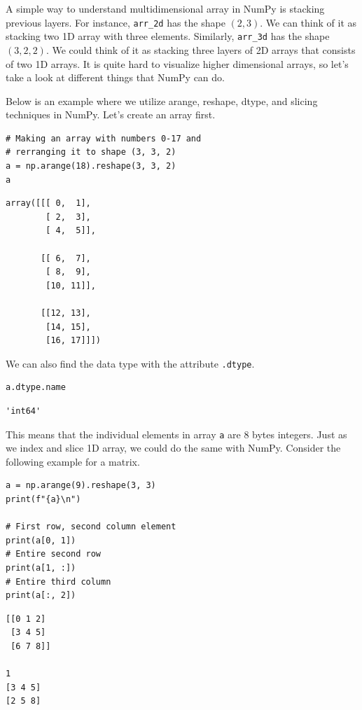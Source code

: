 \documentclass[../../../main.tex]{subfiles}
\begin{document}
A simple way to understand multidimensional array in NumPy is
stacking previous layers. For instance, \verb|arr_2d| has the
shape $(2, 3)$. We can think of it as stacking two 1D array
with three elements. Similarly, \verb|arr_3d| has the shape
$(3, 2, 2)$. We could think of it as stacking three layers of
2D arrays that consists of two 1D arrays. It is quite hard
to visualize higher dimensional arrays, so let's take a look
at different things that NumPy can do.

Below is an example where we utilize arange, reshape, dtype,
and slicing techniques in NumPy. Let's create an array first.

\begin{jupyter}
\begin{lstlisting}[style=jin]
# Making an array with numbers 0-17 and
# rerranging it to shape (3, 3, 2)
a = np.arange(18).reshape(3, 3, 2)
a
\end{lstlisting}

\begin{lstlisting}[style=jout]
array([[[ 0,  1],
        [ 2,  3],
        [ 4,  5]],

       [[ 6,  7],
        [ 8,  9],
        [10, 11]],

       [[12, 13],
        [14, 15],
        [16, 17]]])
\end{lstlisting}
\end{jupyter}

We can also find the data type with the attribute \verb|.dtype|.

\begin{jupyter}
\begin{lstlisting}[style=jin]
a.dtype.name
\end{lstlisting}

\begin{lstlisting}[style=jout]
'int64'
\end{lstlisting}
\end{jupyter}

This means that the individual elements in array \verb|a| are 8
bytes integers. Just as we index and slice 1D array, we could
do the same with NumPy. Consider the following example for a
matrix.

\begin{jupyter}
\begin{lstlisting}[style=jin]
a = np.arange(9).reshape(3, 3)
print(f"{a}\n")

# First row, second column element
print(a[0, 1])
# Entire second row
print(a[1, :])
# Entire third column
print(a[:, 2])
\end{lstlisting}

\begin{lstlisting}[style=jout]
[[0 1 2]
 [3 4 5]
 [6 7 8]]

1
[3 4 5]
[2 5 8]
\end{lstlisting}
\end{jupyter}
\end{document}
